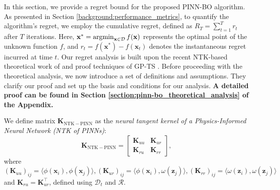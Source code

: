 In this section, we provide a regret bound for the proposed PINN-BO algorithm. As presented in Section \ref{background:performance_metrics}, to quantify the algorithm's regret, we employ the cumulative regret, defined as $R_T = \sum_{t=1}^T r_t$ after $T$ iterations. Here, $\mathbf{x}^* = \operatorname*{argmin}_{\mathbf{x} \in \mathcal{D}} f(\mathbf{x})$ represents the optimal point of the unknown function $f$, and $r_t = f(\mathbf{x^*}) - f(\mathbf{x}_t)$ denotes the instantaneous regret incurred at time $t$. Our regret analysis is built upon the recent NTK-based theoretical work of \citet{wang2022and} and proof techniques of GP-TS \citet{chowdhury2017kernelized}. Before proceeding with the theoretical analysis, we now introduce a set of definitions and assumptions. They clarify our proof and set up the basis and conditions for our analysis. \textbf{A detailed proof can be found in Section \ref{section:pinn-bo_theoretical_analysis} of the Appendix.}   
\begin{definition}
    We define matrix $\mathbf{K}_\mathrm{NTK-PINN}$ as  the \textit{neural tangent kernel of a Physics-Informed Neural Network (NTK of PINNs)}: 
\begin{equation}
\renewcommand\arraystretch{1.2}
    \label{definition:PINN-NTKs}
\mathbf{K}_\mathrm{NTK-PINN} = 
\begin{bmatrix}
    \mathbf{K}_{uu} & \mathbf{K}_{ur} \\
    \mathbf{K}_{ru} & \mathbf{K}_{rr}
\end{bmatrix},
\end{equation}
where $(\mathbf{K}_{uu})_{ij} = \langle \phi(\mathbf{x}_i), \phi(\mathbf{x}_j) \rangle, 
 (\mathbf{K}_{ur})_{ij} = \langle \phi(\mathbf{x}_i), \omega(\mathbf{z}_j) \rangle, (\mathbf{K}_{rr})_{ij} = \langle \omega(\mathbf{z}_i), \omega(\mathbf{z}_j) \rangle$ and $\mathbf{K}_{ru} = \mathbf{K}_{ur}^\top$, defined using $\mathcal{D}_t$ and $\mathcal R$. 
\end{definition}

